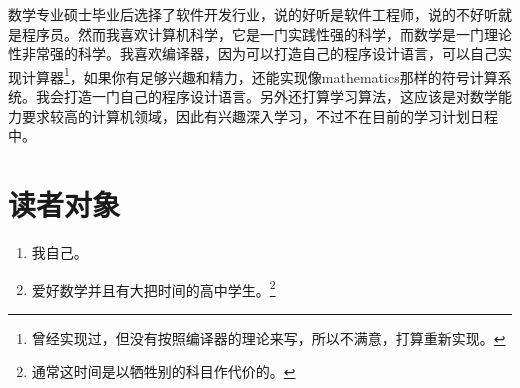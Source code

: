 数学专业硕士毕业后选择了软件开发行业，说的好听是软件工程师，说的不好听就是程序员。然而我喜欢计算机科学，它是一门实践性强的科学，而数学是一门理论性非常强的科学。我喜欢编译器，因为可以打造自己的程序设计语言，可以自己实现计算器\footnote{曾经实现过，但没有按照编译器的理论来写，所以不满意，打算重新实现。}，如果你有足够兴趣和精力，还能实现像mathematics那样的符号计算系统。我会打造一门自己的程序设计语言。另外还打算学习算法，这应该是对数学能力要求较高的计算机领域，因此有兴趣深入学习，不过不在目前的学习计划日程中。

\section{读者对象}

\begin{enumerate}
\item 我自己。
\item 爱好数学并且有大把时间的高中学生。\footnote{通常这时间是以牺牲别的科目作代价的。}
\end{enumerate}

